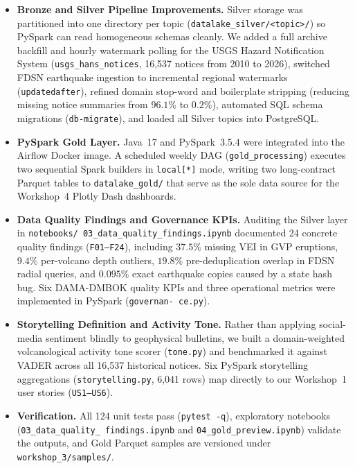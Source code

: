 \documentclass[11pt,a4paper]{article}
\begin{document}
\begin{itemize}
  \item \textbf{Bronze and Silver Pipeline Improvements.} Silver storage was partitioned into one directory per topic (\texttt{datalake\_silver/<topic>/}) so PySpark can read homogeneous schemas cleanly. We added a full archive backfill and hourly watermark polling for the USGS Hazard Notification System (\texttt{usgs\_hans\_notices}, 16,537 notices from 2010 to 2026), switched FDSN earthquake ingestion to incremental regional watermarks (\texttt{updatedafter}), refined domain stop-word and boilerplate stripping (reducing missing notice summaries from $96.1\%$ to $0.2\%$), automated SQL schema migrations (\texttt{db-migrate}), and loaded all Silver topics into PostgreSQL.
  \item \textbf{PySpark Gold Layer.} Java~17 and PySpark~3.5.4 were integrated into the Airflow Docker image. A scheduled weekly DAG (\texttt{gold\_processing}) executes two sequential Spark builders in \texttt{local[*]} mode, writing two long-contract Parquet tables to \texttt{datalake\_gold/} that serve as the sole data source for the Workshop~4 Plotly Dash dashboards.
  \item \textbf{Data Quality Findings and Governance KPIs.} Auditing the Silver layer in \texttt{notebooks/ 03\_data\_quality\_findings.ipynb} documented 24 concrete quality findings (\texttt{F01--F24}), including $37.5\%$ missing VEI in GVP eruptions, $9.4\%$ per-volcano depth outliers, $19.8\%$ pre-deduplication overlap in FDSN radial queries, and $0.095\%$ exact earthquake copies caused by a state hash bug. Six DAMA-DMBOK quality KPIs and three operational metrics were implemented in PySpark (\texttt{governan- ce.py}).
  \item \textbf{Storytelling Definition and Activity Tone.} Rather than applying social-media sentiment blindly to geophysical bulletins, we built a domain-weighted volcanological activity tone scorer (\texttt{tone.py}) and benchmarked it against VADER across all 16,537 historical notices. Six PySpark storytelling aggregations (\texttt{storytelling.py}, 6,041 rows) map directly to our Workshop~1 user stories (\texttt{US1--US6}).
  \item \textbf{Verification.} All 124 unit tests pass (\texttt{pytest -q}), exploratory notebooks (\texttt{03\_data\_quality\_ findings.ipynb} and \texttt{04\_gold\_preview.ipynb}) validate the outputs, and Gold Parquet samples are versioned under \texttt{workshop\_3/samples/}.
\end{itemize}
\end{document}
